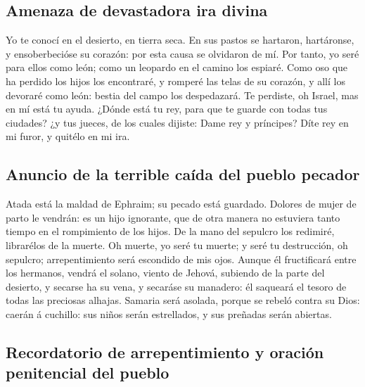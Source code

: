 \hypertarget{amenaza-de-devastadora-ira-divina}{%
\subsection{Amenaza de devastadora ira
divina}\label{amenaza-de-devastadora-ira-divina}}

 Yo te conocí en el desierto, en tierra seca.
 En sus pastos se hartaron, hartáronse, y ensoberbecióse
su corazón: por esta causa se olvidaron de mí.  Por tanto,
yo seré para ellos como león; como un leopardo en el camino los espiaré.
 Como oso que ha perdido los hijos los encontraré, y
romperé las telas de su corazón, y allí los devoraré como león: bestia
del campo los despedazará.  Te perdiste, oh Israel, mas en
mí está tu ayuda.  ¿Dónde está tu rey, para que te guarde
con todas tus ciudades? ¿y tus jueces, de los cuales dijiste: Dame rey y
príncipes?  Díte rey en mi furor, y quitélo en mi ira.

\hypertarget{anuncio-de-la-terrible-cauxedda-del-pueblo-pecador}{%
\subsection{Anuncio de la terrible caída del pueblo
pecador}\label{anuncio-de-la-terrible-cauxedda-del-pueblo-pecador}}

 Atada está la maldad de Ephraim; su pecado está
guardado.  Dolores de mujer de parto le vendrán: es un
hijo ignorante, que de otra manera no estuviera tanto tiempo en el
rompimiento de los hijos.  De la mano del sepulcro los
redimiré, librarélos de la muerte. Oh muerte, yo seré tu muerte; y seré
tu destrucción, oh sepulcro; arrepentimiento será escondido de mis ojos.
 Aunque él fructificará entre los hermanos, vendrá el
solano, viento de Jehová, subiendo de la parte del desierto, y secarse
ha su vena, y secaráse su manadero: él saqueará el tesoro de todas las
preciosas alhajas.  Samaria será asolada, porque se
rebeló contra su Dios: caerán á cuchillo: sus niños serán estrellados, y
sus preñadas serán abiertas.

\hypertarget{recordatorio-de-arrepentimiento-y-oraciuxf3n-penitencial-del-pueblo}{%
\subsection{Recordatorio de arrepentimiento y oración penitencial del
pueblo}\label{recordatorio-de-arrepentimiento-y-oraciuxf3n-penitencial-del-pueblo}}

